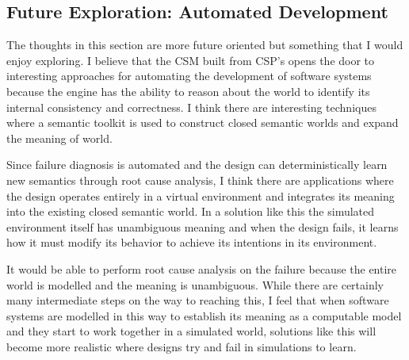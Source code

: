 \subsection{Future Exploration: Automated Development}

The thoughts in this section are more future oriented but something that I would enjoy exploring. I believe that the CSM built from CSP's opens the door to interesting approaches for automating the development of software systems because the engine has the ability to reason about the world to identify its internal consistency and correctness. I think there are interesting techniques where a semantic toolkit is used to construct closed semantic worlds and expand the meaning of world.

Since failure diagnosis is automated and the design can deterministically learn new semantics through root cause analysis, I think there are applications where the design operates entirely in a virtual environment and integrates its meaning into the existing closed semantic world. In a solution like this the simulated environment itself has unambiguous meaning and when the design fails, it learns how it must modify its behavior to achieve its intentions in its environment.

It would be able to perform root cause analysis on the failure because the entire world is modelled and the meaning is unambiguous. While there are certainly many intermediate steps on the way to reaching this, I feel that when software systems are modelled in this way to establish its meaning as a computable model and they start to work together in a simulated world, solutions like this will become more realistic where designs try and fail in simulations to learn. 